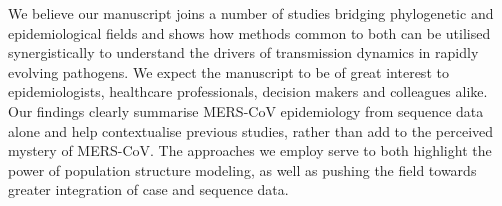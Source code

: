 \documentclass[stdletter,letterpaper,addrfromright,orderfromdateto,dateleft,11pt,noaddrto,sigleft]{newlfm}
\begin{document}
\begin{newlfm}
We believe our manuscript joins a number of studies bridging phylogenetic and epidemiological fields and shows how methods common to both can be utilised synergistically to understand the drivers of transmission dynamics in rapidly evolving pathogens.
We expect the manuscript to be of great interest to epidemiologists, healthcare professionals, decision makers and colleagues alike.
Our findings clearly summarise MERS-CoV epidemiology from sequence data alone and help contextualise previous studies, rather than add to the perceived mystery of MERS-CoV.
The approaches we employ serve to both highlight the power of population structure modeling, as well as pushing the field towards greater integration of case and sequence data.

\end{newlfm}
\end{document}
